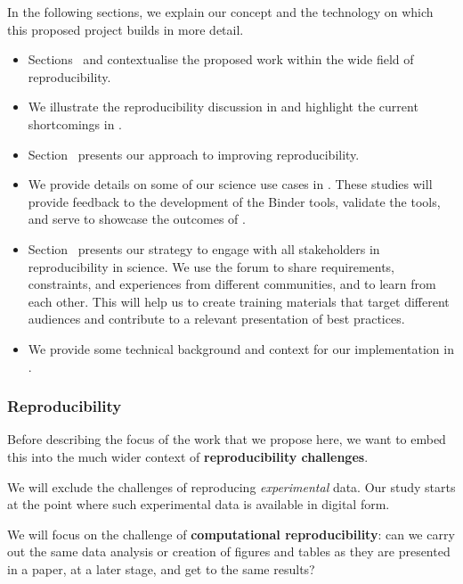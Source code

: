 In the following sections, we explain our concept and the technology on which this
proposed project builds in more detail.
\begin{itemize}
\item Sections~ and
   contextualise the proposed work
  within the wide field of reproducibility.
\item We illustrate the reproducibility discussion in
   and highlight the current shortcomings
  in .
\item Section~ presents our approach to improving reproducibility.
\item We provide details on some of our science use cases in
  . These studies will provide feedback to the development of the
  Binder tools, validate the tools, and serve to showcase the outcomes of \TheProject.
\item Section~ presents our strategy to
  engage with all stakeholders in reproducibility in science. We use the forum to
  share requirements, constraints, and experiences from different communities,
  and to learn from each other. This will help us to
  create training materials that target different audiences and
  contribute to a relevant presentation of best practices.
\item We provide some technical background and context for our implementation in .
\end{itemize}

\medskip

\subsubsection{Reproducibility}\label{sec:concept}\label{sec:reproducibility}

Before describing the focus of the work that we propose here, we want to embed
this into the much wider context of \textbf{reproducibility challenges}.

We will exclude the challenges of reproducing \emph{experimental} data. Our
study starts at the point where such experimental data is available in digital
form.

We will focus on the challenge of \textbf{computational reproducibility}: can we carry out
the same data analysis or creation of figures and tables as they are presented in
a paper, at a later stage, and get to the same results?

